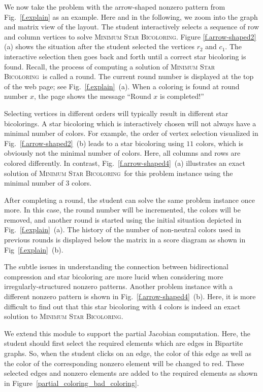 \documentclass[12pt, twoside,a4paper,toc=bibliography]{scrbook}
\newcommand{\MinStaBic}{\textsc{Minimum Star Bicoloring}}
\begin{document}
We now take the problem with the arrow-shaped nonzero pattern from Fig.~\ref{f.explain}
as an example. Here and in the following, we zoom into the graph and matrix view of the
layout. The student interactively selects a sequence of row and column vertices to solve
\MinStaBic. Figure \ref{f.arrow-shaped2} (a) shows the situation after the student
selected the vertices $r_2$ and $c_1$.
The interactive selection then goes back and forth until a correct star bicoloring is
found. Recall, the process of computing a solution of \MinStaBic\ is called a round.
The current round number is displayed at the top of the web page; see
Fig.~\ref{f.explain}~(a). When a coloring is found at round number $x$, the page shows
the message ``Round $x$ is completed!''

Selecting vertices in different orders will typically result in different star
bicolorings. A star bicoloring which is interactively chosen will not always have a
minimal number of colors. For example, the order of vertex selection visualized in
Fig.~\ref{f.arrow-shaped2}~(b) leads to a star bicoloring using $11$ colors, which is
obviously not the minimal number of colors. Here, all columns and rows are colored
differently. In contrast, Fig.~\ref{f.arrow-shaped4}~(a) illustrates an exact solution of
\MinStaBic\ for this problem instance using the minimal number of $3$ colors.

After completing a round, the student can solve the same problem instance once more. In
this case, the round number will be incremented, the colors will be removed, and another
round is started using the initial situation depicted in Fig.~\ref{f.explain}~(a). The
history of the number of non-neutral colors used in previous rounds is displayed below
the matrix in a score diagram as shown in Fig~\ref{f.explain}~(b).

The subtle issues in understanding the connection between bidirectional compression and
star bicoloring are more lucid when considering more irregularly-structured nonzero
patterns. Another problem instance with a different nonzero pattern is shown in
Fig.~\ref{f.arrow-shaped4}~(b). Here, it is more difficult to find out that this star
bicoloring with $4$ colors is indeed an exact solution to \MinStaBic.

We extend this module to support
the partial Jacobian computation. Here, the student should
first select the required elements which are edges in Bipartite graphs.
So, when the student clicks on an edge, the color of this edge
as well as the color of the corresponding nonzero element will be changed to red.
These selected edges and nonzero elements are added to the required elements
as shown in Figure~\ref{partial_coloring_bad_coloring}.
\end{document}

